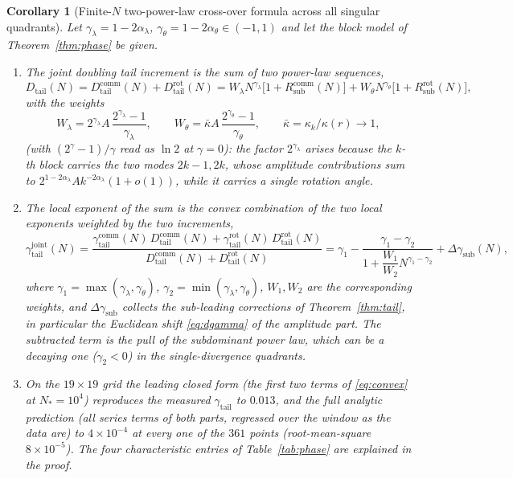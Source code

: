 \documentclass[11pt,reqno]{amsart}
\theoremstyle{plain}
\newtheorem{corollary}[theorem]{Corollary}
\theoremstyle{definition}
\theoremstyle{remark}
\numberwithin{equation}{section}
\newcommand{\Dtail}{D_{\mathrm{tail}}}
\newcommand{\gtail}{\gamma_{\mathrm{tail}}}
\begin{document}
\begin{corollary}[Finite-$N$ two-power-law cross-over formula across all singular quadrants]\label{cor:crossover}
Let $\gamma_\lambda=1-2\alpha_\lambda$, $\gamma_\theta=1-2\alpha_\theta\in(-1,1)$ and let the block model of Theorem~\ref{thm:phase} be given.
\begin{enumerate}[label=\textup{(\arabic*)}]
\item The joint doubling tail increment is the sum of two power-law sequences,
\begin{equation}\label{eq:twopower}
\Dtail(N)=\Dtail^{\mathrm{comm}}(N)+\Dtail^{\mathrm{rot}}(N)
=W_\lambda N^{\gamma_\lambda}\bigl[1+R^{\mathrm{comm}}_{\mathrm{sub}}(N)\bigr]+W_\theta N^{\gamma_\theta}\bigl[1+R^{\mathrm{rot}}_{\mathrm{sub}}(N)\bigr],
\end{equation}
with the weights
\begin{equation}\label{eq:weights}
W_\lambda=2^{\gamma_\lambda}A\,\frac{2^{\gamma_\lambda}-1}{\gamma_\lambda},\qquad W_\theta=\bar\kappa A\,\frac{2^{\gamma_\theta}-1}{\gamma_\theta},\qquad \bar\kappa=\kappa_k/\kappa(r)\to1,
\end{equation}
(with $(2^\gamma-1)/\gamma$ read as $\ln2$ at $\gamma=0$): the factor $2^{\gamma_\lambda}$ arises because the $k$-th block carries the two modes $2k-1,2k$, whose amplitude contributions sum to $2^{1-2\alpha_\lambda}Ak^{-2\alpha_\lambda}(1+o(1))$, while it carries a single rotation angle.
\item The local exponent of the sum is the convex combination of the two local exponents weighted by the two increments,
\begin{equation}\label{eq:convex}
\gtail^{\mathrm{joint}}(N)=\frac{\gamma^{\mathrm{comm}}_{\mathrm{tail}}(N)\,\Dtail^{\mathrm{comm}}(N)+\gamma^{\mathrm{rot}}_{\mathrm{tail}}(N)\,\Dtail^{\mathrm{rot}}(N)}{\Dtail^{\mathrm{comm}}(N)+\Dtail^{\mathrm{rot}}(N)}
=\gamma_1-\frac{\gamma_1-\gamma_2}{1+\dfrac{W_1}{W_2}N^{\gamma_1-\gamma_2}}+\Delta\gamma_{\mathrm{sub}}(N),
\end{equation}
where $\gamma_1=\max(\gamma_\lambda,\gamma_\theta)$, $\gamma_2=\min(\gamma_\lambda,\gamma_\theta)$, $W_1,W_2$ are the corresponding weights, and $\Delta\gamma_{\mathrm{sub}}$ collects the sub-leading corrections of Theorem~\ref{thm:tail}, in particular the Euclidean shift \eqref{eq:dgamma} of the amplitude part. The subtracted term is the pull of the subdominant power law, which can be a decaying one ($\gamma_2<0$) in the single-divergence quadrants.
\item On the $19\times19$ grid the leading closed form (the first two terms of \eqref{eq:convex} at $N_*=10^4$) reproduces the measured $\gtail$ to $0.013$, and the full analytic prediction (all series terms of both parts, regressed over the window as the data are) to $4\times10^{-4}$ at every one of the $361$ points (root-mean-square $8\times10^{-5}$). The four characteristic entries of Table~\ref{tab:phase} are explained in the proof.
\end{enumerate}
\end{corollary}
\end{document}
